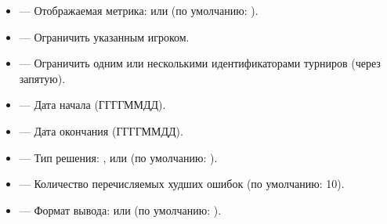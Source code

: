 \documentclass[letterpaper,10pt,russian]{sphinxmanual}
\begin{document}
\sphinxAtStartPar
{}
\begin{itemize}
\item {} 
\sphinxAtStartPar
{} — Отображаемая метрика:  или  (по умолчанию: ).

\item {} 
\sphinxAtStartPar
{} — Ограничить указанным игроком.

\item {} 
\sphinxAtStartPar
{} — Ограничить одним или несколькими идентификаторами турниров (через запятую).

\item {} 
\sphinxAtStartPar
{} — Дата начала (ГГГГ\sphinxhyphen{}ММ\sphinxhyphen{}ДД).

\item {} 
\sphinxAtStartPar
{} — Дата окончания (ГГГГ\sphinxhyphen{}ММ\sphinxhyphen{}ДД).

\item {} 
\sphinxAtStartPar
{} — Тип решения: ,  или  (по умолчанию: ).

\item {} 
\sphinxAtStartPar
{} — Количество перечисляемых худших ошибок (по умолчанию: 10).

\item {} 
\sphinxAtStartPar
{} — Формат вывода:  или  (по умолчанию: ).

\end{itemize}

\sphinxAtStartPar
{}
\end{document}
